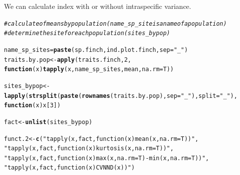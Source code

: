 \documentclass[12pt]{article}\usepackage[]{graphicx}\usepackage[]{color}
\makeatletter
\newcommand{\hlnum}[1]{\textcolor[rgb]{0.686,0.059,0.569}{#1}}%
\newcommand{\hlstr}[1]{\textcolor[rgb]{0.192,0.494,0.8}{#1}}%
\newcommand{\hlcom}[1]{\textcolor[rgb]{0.678,0.584,0.686}{\textit{#1}}}%
\newcommand{\hlstd}[1]{\textcolor[rgb]{0.345,0.345,0.345}{#1}}%
\newcommand{\hlkwa}[1]{\textcolor[rgb]{0.161,0.373,0.58}{\textbf{#1}}}%
\newcommand{\hlkwb}[1]{\textcolor[rgb]{0.69,0.353,0.396}{#1}}%
\newcommand{\hlkwc}[1]{\textcolor[rgb]{0.333,0.667,0.333}{#1}}%
\newcommand{\hlkwd}[1]{\textcolor[rgb]{0.737,0.353,0.396}{\textbf{#1}}}%
\newenvironment{kframe}{%
 \def\at@end@of@kframe{}%
 \ifinner\ifhmode%
  \def\at@end@of@kframe{\end{minipage}}%
  \begin{minipage}{\columnwidth}%
 \fi\fi%
 \def\FrameCommand##1{\hskip\@totalleftmargin \hskip-\fboxsep
 \colorbox{shadecolor}{##1}\hskip-\fboxsep
     \hskip-\linewidth \hskip-\@totalleftmargin \hskip\columnwidth}%
 \MakeFramed {\advance\hsize-\width
   \@totalleftmargin\z@ \linewidth\hsize
   \@setminipage}}%
 {\par\unskip\endMakeFramed%
 \at@end@of@kframe}
\newenvironment{knitrout}{}{} %
\makeatother
\begin{document}
We can calculate index with or without intraspecific variance.

\begin{knitrout}
\color{fgcolor}\begin{kframe}
\begin{alltt}
\hlcom{#calculate  of means by population (name_sp_site is a name of a population) }
\hlcom{#determine the site for each population (sites_bypop)}

\hlstd{name_sp_sites} \hlkwb{=} \hlkwd{paste}\hlstd{(sp.finch, ind.plot.finch,} \hlkwc{sep} \hlstd{=} \hlstr{"_"}\hlstd{)}
\hlstd{traits.by.pop}\hlkwb{<-}\hlkwd{apply}\hlstd{(traits.finch,} \hlnum{2} \hlstd{,}
           \hlkwa{function} \hlstd{(}\hlkwc{x}\hlstd{)} \hlkwd{tapply}\hlstd{(x, name_sp_sites, mean ,} \hlkwc{na.rm} \hlstd{= T))}

\hlstd{sites_bypop}\hlkwb{<-}\hlkwd{lapply}\hlstd{(}\hlkwd{strsplit}\hlstd{(}\hlkwd{paste}\hlstd{(}\hlkwd{rownames}\hlstd{(traits.by.pop),} \hlkwc{sep} \hlstd{=} \hlstr{"_"}\hlstd{),} \hlkwc{split} \hlstd{=} \hlstr{"_"}\hlstd{),}
          \hlkwa{function}\hlstd{(}\hlkwc{x}\hlstd{) x[}\hlnum{3}\hlstd{])}

\hlstd{fact}\hlkwb{<-}\hlkwd{unlist}\hlstd{(sites_bypop)}

\hlstd{funct.2}\hlkwb{<-}\hlkwd{c}\hlstd{(}\hlstr{"tapply(x, fact, function(x) mean(x, na.rm = T))"}\hlstd{,}
          \hlstr{"tapply(x, fact, function(x) kurtosis(x, na.rm = T))"}\hlstd{,}
          \hlstr{"tapply(x, fact, function(x) max(x, na.rm = T)-min(x, na.rm = T))"}\hlstd{,}
          \hlstr{"tapply(x, fact, function(x) CVNND(x))"}\hlstd{)}
\end{alltt}
\end{kframe}
\end{knitrout}
\end{document}

